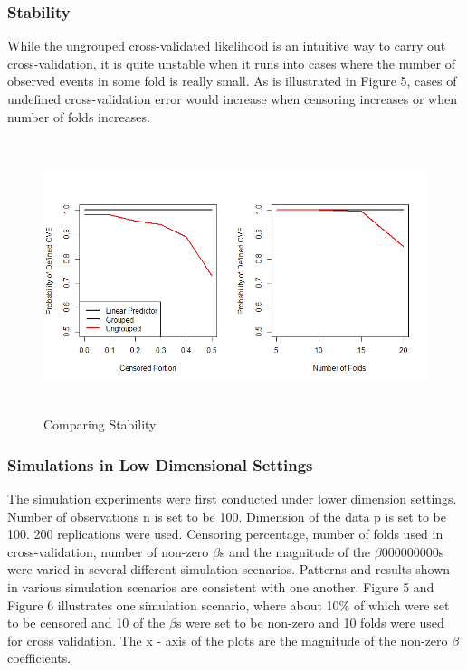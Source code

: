\documentclass{article}\usepackage[]{graphicx}\usepackage[]{color}
\begin{document}
    \subsubsection {Stability}
   While the ungrouped cross-validated likelihood is an intuitive way to carry out cross-validation, it is quite unstable when it runs into cases where the number of observed events in some fold is really small. As is illustrated in Figure 5, cases of undefined cross-validation error would increase when censoring increases or when number of folds increases. 

\begin{figure}
    \centering
		\includegraphics[height= 8cm ]{./figures/stability2.png}
    \caption{Comparing Stability}
\end{figure}	
    
    
    \subsubsection {Simulations in Low Dimensional Settings}
    
   The simulation experiments were first conducted under lower dimension settings. Number of observations n is set to be 100. Dimension of the data p is set to be 100. 200 replications were used. Censoring percentage, number of folds used in cross-validation, number of non-zero $\beta$s and the magnitude of the $\beta$000000000s were varied in several different simulation scenarios. Patterns and results shown in various simulation scenarios are consistent with one another. Figure 5 and Figure 6 illustrates one simulation scenario, where about 10$\%$ of which were set to be censored and 10 of the $\beta$s were set to be non-zero and 10 folds were used for cross validation. The x - axis of the plots are the magnitude of the non-zero $\beta$ coefficients. 
   
\end{document}
